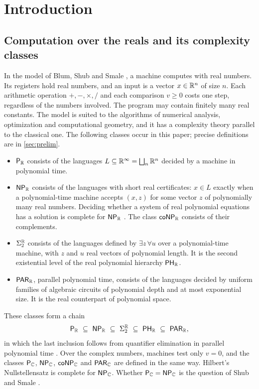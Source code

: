 \section{Introduction}\label{sec:intro}

\subsection{Computation over the reals and its complexity classes}

In the model of Blum, Shub and Smale \cite{BSS89,BCSS98}, a machine computes with real numbers. Its registers hold real numbers, and an input is a vector $x\in\mathbb{R}^n$ of size $n$. Each arithmetic operation $+,-,\times,/$ and each comparison $v\ge0$ costs one step, regardless of the numbers involved. The program may contain finitely many real constants. The model is suited to the algorithms of numerical analysis, optimization and computational geometry, and it has a complexity theory parallel to the classical one. The following classes occur in this paper; precise definitions are in \cref{sec:prelim}.

\begin{itemize}[leftmargin=1.6em,itemsep=2pt]
\item $\textsf{\upshape P}_{\mathbb{R}}$ consists of the languages $L\subseteq\mathbb{R}^\infty=\bigsqcup_n\mathbb{R}^n$ decided by a machine in polynomial time.
\item $\textsf{\upshape NP}_{\mathbb{R}}$ consists of the languages with short real certificates: $x\in L$ exactly when a polynomial-time machine accepts $(x,z)$ for some vector $z$ of polynomially many real numbers. Deciding whether a system of real polynomial equations has a solution is complete for $\textsf{\upshape NP}_{\mathbb{R}}$ \cite{BSS89}. The class $\textsf{\upshape coNP}_{\mathbb{R}}$ consists of their complements.
\item $\Sigma_2^{\mathbb{R}}$ consists of the languages defined by $\exists z\,\forall u$ over a polynomial-time machine, with $z$ and $u$ real vectors of polynomial length. It is the second existential level of the real polynomial hierarchy $\textsf{\upshape PH}_{\mathbb{R}}$.
\item $\textsf{\upshape PAR}_{\mathbb{R}}$, parallel polynomial time, consists of the languages decided by uniform families of algebraic circuits of polynomial depth and at most exponential size. It is the real counterpart of polynomial space.
\end{itemize}

These classes form a chain
\begin{equation}\label{eq:chain}
\PR\ \subseteq\ \NPR\ \subseteq\ \Sigma_2^{\RR}\ \subseteq\ \PHR\ \subseteq\ \PARR ,
\end{equation}
in which the last inclusion follows from quantifier elimination in parallel polynomial time \cite{Ren92,Cuc93,BCSS98}. Over the complex numbers, machines test only $v=0$, and the classes $\textsf{\upshape P}_{\mathbb{C}}$, $\textsf{\upshape NP}_{\mathbb{C}}$, $\textsf{\upshape coNP}_{\mathbb{C}}$ and $\textsf{\upshape PAR}_{\mathbb{C}}$ are defined in the same way. Hilbert's Nullstellensatz is complete for $\textsf{\upshape NP}_{\mathbb{C}}$. Whether $\textsf{\upshape P}_{\mathbb{C}}=\textsf{\upshape NP}_{\mathbb{C}}$ is the question of Shub and Smale \cite{SS95,BCSS98}.

